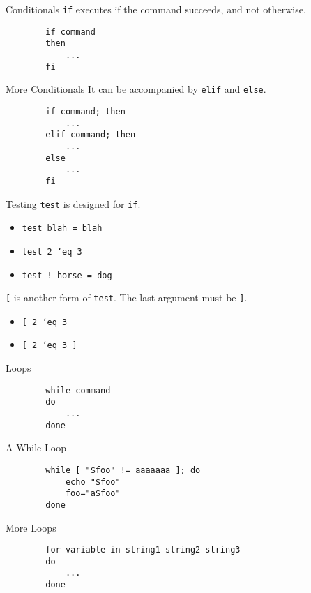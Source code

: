 \documentclass[pdf,usenames,dvipsnames,14pt]{beamer}%
\newcommand\hyphen{\char`\-}
\begin{document}
\begin{frame}[fragile]{Conditionals}
	\texttt{if} executes if the command succeeds, and not otherwise.
	\begin{verbatim}
		if command
		then
		    ...
		fi
	\end{verbatim}
\end{frame}

\begin{frame}[fragile]{More Conditionals}
	It can be accompanied by \texttt{elif} and \texttt{else}.
	\begin{verbatim}
		if command; then
		    ...
		elif command; then
		    ...
		else
		    ...
		fi
	\end{verbatim}
\end{frame}

\begin{frame}{Testing}
	\texttt{test} is designed for \texttt{if}.
	\begin{itemize}
		\item \texttt{test blah = blah}
		\item \texttt{test 2 \hyphen eq 3}
		\item \texttt{test ! horse = dog}
	\end{itemize}
	
	\texttt{[} is another form of \texttt{test}. The last argument must be \texttt{]}.
	\begin{itemize}
		\item \texttt{[ 2 \hyphen eq 3}
		\item \texttt{[ 2 \hyphen eq 3 ]}
	\end{itemize}
\end{frame}

\begin{frame}[fragile]{Loops}
	\begin{verbatim}
		while command
		do
		    ...
		done
	\end{verbatim}
\end{frame}

\begin{frame}[fragile]{A While Loop}
	\begin{verbatim}
		while [ "$foo" != aaaaaaa ]; do
		    echo "$foo"
		    foo="a$foo"
		done
	\end{verbatim}
\end{frame}

\begin{frame}[fragile]{More Loops}
	\begin{verbatim}
		for variable in string1 string2 string3
		do
		    ...
		done
	\end{verbatim}
\end{frame}
\end{document}
